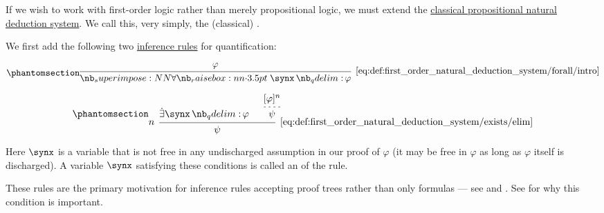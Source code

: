 \begin{definition}\label{def:first_order_natural_deduction_system}
  If we wish to work with first-order logic rather than merely propositional logic, we must extend the \hyperref[def:propositional_natural_deduction_systems]{classical propositional natural deduction system}. We call this, very simply, the (classical) .

  \begin{thmenum}
     We first add the following two \hyperref[def:inference_rule]{inference rules} for quantification:

    \begin{minipage}{0.45\textwidth}
      \begin{equation*}\taglabel[\ensuremath{ \synforall_+ }]{eq:def:first_order_natural_deduction_system/forall/intro}
        \begin{prooftree}
          \hypo{ \varphi }
          \infer1[\ref{eq:def:first_order_natural_deduction_system/forall/intro}]{ \qforall \synx \varphi }
        \end{prooftree}
      \end{equation*}
    \end{minipage}
    \hfill
    \begin{minipage}{0.45\textwidth}
      \begin{equation*}\taglabel[\ensuremath{ \synexists_- }]{eq:def:first_order_natural_deduction_system/exists/elim}
        \begin{prooftree}
          \hypo{ \qexists \synx \varphi }
          \hypo{ [\varphi]^n }
          \infer[dashed]1{ \psi }
          \infer[left label=\( n \)]2[\ref{eq:def:first_order_natural_deduction_system/exists/elim}]{ \psi }
        \end{prooftree}
      \end{equation*}
    \end{minipage}

    Here \( \synx \) is a variable that is not free in any undischarged assumption in our proof of \( \varphi \) (it may be free in \( \varphi \) as long as \( \varphi \) itself is discharged). A variable \( \synx \) satisfying these conditions is called an  of the rule.

    These rules are the primary motivation for inference rules accepting proof trees rather than only formulas --- see  and . See  for why this condition is important.


\end{thmenum}
\end{definition}

